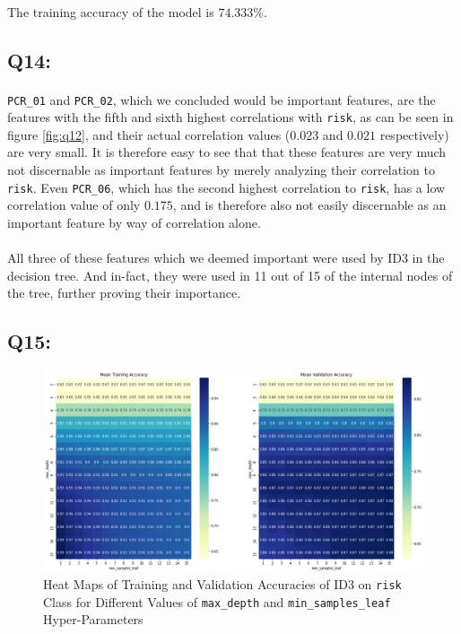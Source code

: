 \documentclass{article}
\newcommand{\code}[1]{\texttt{#1}}
\begin{document}
    \paragraph*{}
    The training accuracy of the model is $74.333\%$.
\subsection*{Q14:}
    \paragraph*{}
    \code{PCR\_01} and \code{PCR\_02}, which we concluded would be important features, are the features with the fifth and sixth highest correlations with \code{risk}, as can be seen in figure \ref{fig:q12}, and their actual correlation values ($0.023$ and $0.021$ respectively) are very small. It is therefore easy to see that that these features are very much not discernable as important features by merely analyzing their correlation to \code{risk}. Even \code{PCR\_06}, which has the second highest correlation to \code{risk}, has a low correlation value of only $0.175$, and is therefore also not easily discernable as an important feature by way of correlation alone.
    \paragraph*{}
    All three of these features which we deemed important were used by ID3 in the decision tree. And in-fact, they were used in 11 out of 15 of the internal nodes of the tree, further proving their importance.
\subsection*{Q15:}
    \begin{figure}[H]
        \centering
        \includegraphics[scale=0.48]{q15.png}
        \caption{Heat Maps of Training and Validation Accuracies of ID3 on \code{risk} Class for Different Values of \code{max\_depth} and \code{min\_samples\_leaf} Hyper-Parameters}
        \label{fig:q15}
    \end{figure}
\end{document}
